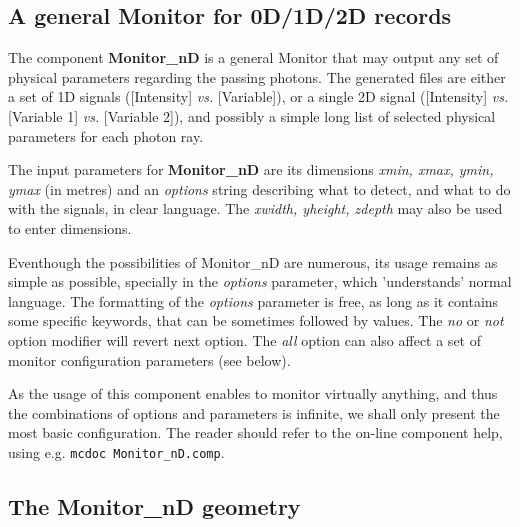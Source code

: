 \subsection*{A general Monitor for 0D/1D/2D records}
\label{s:monitornd}

The component \textbf{Monitor\_nD} is a general Monitor that may output any
set of physical parameters regarding the passing photons. The
generated files are either a set of 1D signals ([Intensity] \textit{vs.}
[Variable]), or a single 2D signal ([Intensity] \textit{vs.} [Variable 1]
\textit{vs.} [Variable 2]), and possibly a simple long list of selected
physical parameters for each photon ray.

The input parameters for \textbf{Monitor\_nD} are its dimensions \textit{xmin, xmax, ymin, ymax} (in metres) and an \textit{
  options} string describing what to detect, and what to do with the
signals, in clear language. The \textit{xwidth, yheight, zdepth} may also be used to enter dimensions.

Eventhough the possibilities of Monitor\_nD are numerous, its usage remains as simple as possible, specially in the \textit{options} parameter, which 'understands' normal language.
The formatting of the \textit{options}
parameter is free, as long as it contains some specific keywords, that
can be sometimes followed by values. The \textit{no} or \textit{not} option
modifier will revert next option. The \textit{all} option can also affect a
set of monitor configuration parameters (see below).

As the usage of this component enables to monitor virtually anything, and thus the combinations of options and parameters is infinite, we shall only present the most basic configuration. The reader should refer to the on-line component help, using e.g. \verb+mcdoc Monitor_nD.comp+.

\subsection{The Monitor\_nD geometry}

